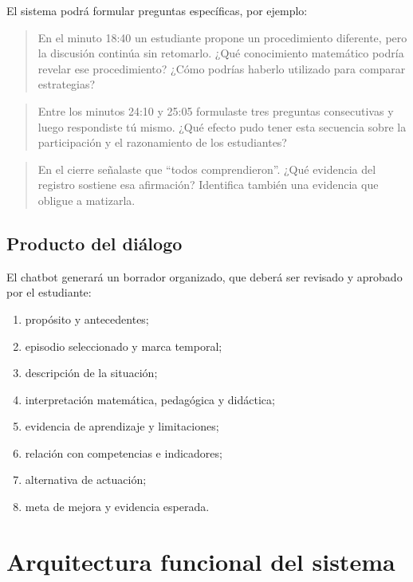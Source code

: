 \documentclass[11pt,a4paper]{article}
\begin{document}
El sistema podrá formular preguntas específicas, por ejemplo:

\begin{quote}
En el minuto 18:40 un estudiante propone un procedimiento diferente, pero la discusión continúa sin retomarlo. ¿Qué conocimiento matemático podría revelar ese procedimiento? ¿Cómo podrías haberlo utilizado para comparar estrategias?
\end{quote}

\begin{quote}
Entre los minutos 24:10 y 25:05 formulaste tres preguntas consecutivas y luego respondiste tú mismo. ¿Qué efecto pudo tener esta secuencia sobre la participación y el razonamiento de los estudiantes?
\end{quote}

\begin{quote}
En el cierre señalaste que ``todos comprendieron''. ¿Qué evidencia del registro sostiene esa afirmación? Identifica también una evidencia que obligue a matizarla.
\end{quote}

\subsection{Producto del diálogo}

El chatbot generará un borrador organizado, que deberá ser revisado y aprobado por el estudiante:

\begin{enumerate}
    \item propósito y antecedentes;
    \item episodio seleccionado y marca temporal;
    \item descripción de la situación;
    \item interpretación matemática, pedagógica y didáctica;
    \item evidencia de aprendizaje y limitaciones;
    \item relación con competencias e indicadores;
    \item alternativa de actuación;
    \item meta de mejora y evidencia esperada.
\end{enumerate}

\section{Arquitectura funcional del sistema}
\end{document}
